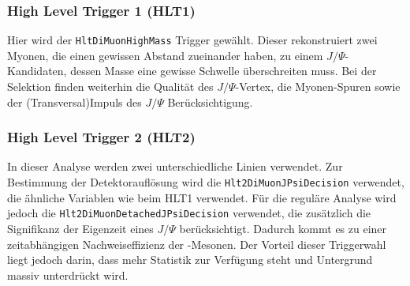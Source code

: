 \subsubsection{High Level Trigger 1 (HLT1)}
Hier wird der \texttt{HltDiMuonHighMass} Trigger gewählt. Dieser rekonstruiert zwei Myonen, die einen gewissen Abstand zueinander haben, zu einem $J/\Psi$-Kan\-di\-da\-ten, dessen Masse eine gewisse Schwelle überschreiten muss. Bei der Selektion finden weiterhin die Qualität des $J/\Psi$-Vertex, die Myonen-Spuren sowie der (Transversal)Impuls des $J/\Psi$ Berücksichtigung.

\subsubsection{High Level Trigger 2 (HLT2)}
In dieser Analyse werden zwei unterschiedliche Linien verwendet. Zur Bestimmung der Detektorauflösung wird die \texttt{Hlt2\-DiMuon\-JPsi\-Decision} verwendet, die ähnliche Variablen wie beim HLT1 verwendet. Für die reguläre Analyse wird jedoch die \texttt{Hlt2\-DiMuon\-Detached\-JPsi\-Decision} verwendet, die zusätzlich die Signifikanz der Eigenzeit eines $J/\Psi$ berücksichtigt. Dadurch kommt es zu einer zeitabhängigen Nachweiseffizienz der \Bd-Mesonen. Der Vorteil dieser Triggerwahl liegt jedoch darin, dass mehr Statistik zur Verfügung steht und Untergrund massiv unterdrückt wird.

